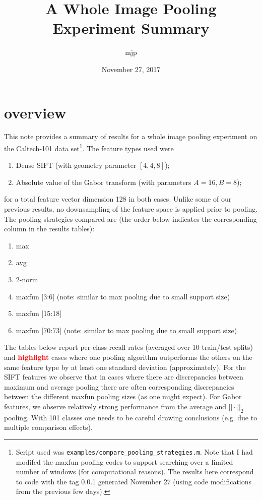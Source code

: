 \documentclass[10pt]{article}
\title{A Whole Image Pooling Experiment Summary}
\author{mjp}
\date{November 27, 2017}
\newcommand{\hl}[1]{\textbf{\textcolor{red}{#1}}}
\begin{document}
\maketitle

\section*{overview}
This note provides a summary of results for a whole image pooling experiment on the Caltech-101 data set\footnote{
Script used was \texttt{examples/compare\_pooling\_strategies.m}.  Note that I had modifed the maxfun pooling codes to support searching over a limited number of windows (for computational reasons).  The results here correspond to code with the tag 0.0.1 generated November 27 (using code modifications from the previous few days).}.  The feature types used were
\begin{enumerate}
\item Dense SIFT (with geometry parameter $[4, 4, 8]$);
\item Absolute value of the Gabor transform (with parameters $A=16, B=8$);
\end{enumerate}
%
for a total feature vector dimension 128 in both cases.
Unlike some of our previous results, no downsampling of the feature space is applied prior to pooling.
The pooling strategies compared are (the order below indicates the corresponding column in the results tables):
%
\begin{enumerate}
\item max
\item avg
\item 2-norm
\item maxfun [3:6]       (note: similar to max pooling due to small support size)
\item maxfun [15:18]
\item maxfun [70:73]  (note: similar to max pooling due to small support size)
\end{enumerate}


The tables below report per-class recall rates (averaged over 10 train/test splits) and \hl{highlight} cases where one pooling algorithm outperforms the others on the same feature type by at least one standard deviation (approximately).
For the SIFT features we observe that in cases where there are discrepancies between maximum and average pooling there are often corresponding discrepancies between the different maxfun pooling sizes (as one might expect).
For Gabor features, we observe relatively strong performance from the average and $||\cdot||_2$ pooling.
With 101 classes one needs to be careful drawing conclusions (e.g. due to multiple comparison effects).
\end{document}
